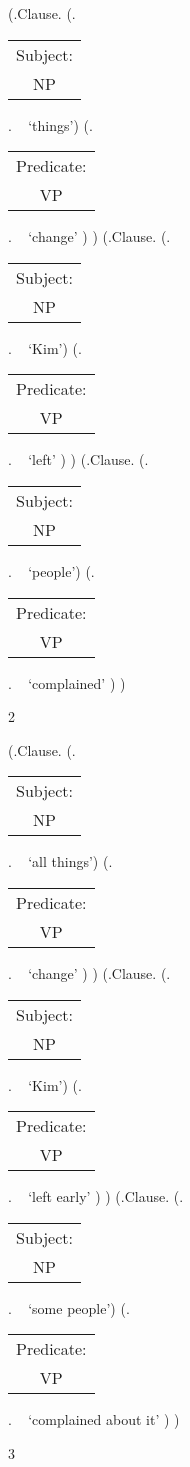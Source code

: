 \documentclass[12pt,letterpaper]{article}
\begin{document}
	\begin{figure}
	\begin{center}
		\begin{parsetree}
			(.Clause.
			(.\begin{tabular}{c}Subject:\\NP\end{tabular}.  ~ `things')
			(.\begin{tabular}{c}Predicate:\\VP\end{tabular}. ~   `change' )
			)
			(.Clause.
			(.\begin{tabular}{c}Subject:\\NP\end{tabular}. ~ `Kim')
			(.\begin{tabular}{c}Predicate:\\VP\end{tabular}. ~ `left' )
			)
			(.Clause.
			(.\begin{tabular}{c}Subject:\\NP\end{tabular}. ~ `people')
			(.\begin{tabular}{c}Predicate:\\VP\end{tabular}. ~ `complained' )
			)
			
			\hfill \break\hfill \break
		\end{parsetree}
		2
	\end{center}
\end{figure}

	\begin{figure}
	\begin{center}
		\begin{parsetree}
			(.Clause.
			(.\begin{tabular}{c}Subject:\\NP\end{tabular}.  ~ `all things')
			(.\begin{tabular}{c}Predicate:\\VP\end{tabular}. ~   `change' )
			)
			(.Clause.
			(.\begin{tabular}{c}Subject:\\NP\end{tabular}. ~ `Kim')
			(.\begin{tabular}{c}Predicate:\\VP\end{tabular}. ~ `left early' )
			)
			(.Clause.
			(.\begin{tabular}{c}Subject:\\NP\end{tabular}. ~ `some people')
			(.\begin{tabular}{c}Predicate:\\VP\end{tabular}. ~ `complained about it' )
			)
			
			\hfill \break\hfill \break
		\end{parsetree}
		3
	\end{center}
\end{figure}
\end{document}
